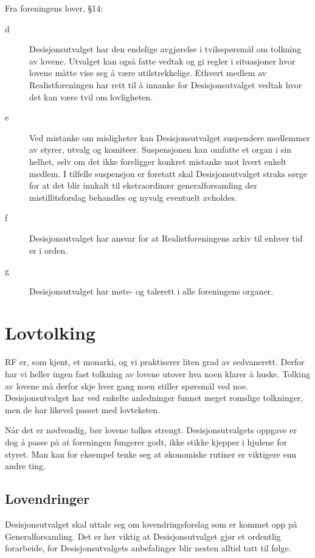 Fra foreningens lover, §14:
\begin{description}
\item[d] Desisjonsutvalget har den endelige avgjørelse i tvilsspørsmål om
tolkning av lovene. Utvalget kan også fatte vedtak og gi regler i situasjoner
hvor lovene måtte vise seg å være utilstrekkelige. Ethvert medlem av
Realistforeningen har rett til å innanke for Desisjonsutvalget vedtak hvor det
kan være tvil om lovligheten.
\item[e] Ved mistanke om misligheter kan Desisjonsutvalget suspendere
medlemmer av styrer, utvalg og komiteer. Suspensjonen kan omfatte et organ i
sin helhet, selv om det ikke foreligger konkret mistanke mot hvert enkelt
medlem. I tilfelle suspensjon er foretatt skal Desisjonsutvalget straks sørge
for at det blir innkalt til ekstraordinær generalforsamling der
mistillitsforslag behandles og nyvalg eventuelt avholdes.
\item[f] Desisjonsutvalget har ansvar for at Realistforeningens arkiv til 
enhver tid er i orden.
\item[g] Desisjonsutvalget har møte- og talerett i alle foreningens organer.
\end{description}

\section{Lovtolking}
RF er, som kjent, et monarki, og vi praktiserer liten grad av sedvanerett. Derfor har vi
heller ingen fast tolkning av lovene utover hva noen klarer å huske. Tolking av lovene
må derfor skje hver gang noen stiller spørsmål ved noe. Desisjonsutvalget har ved enkelte
anledninger funnet meget romslige tolkninger, men de har likevel passet med lovteksten.

Når det er nødvendig, bør lovene tolkes strengt. Desisjonsutvalgets oppgave er dog å passe på
at foreningen fungerer godt, ikke stikke kjepper i hjulene for styret. Man kan for eksempel
tenke seg at økonomiske rutiner er viktigere enn andre ting.

\subsection{Lovendringer}
Desisjonsutvalget skal uttale seg om lovendringsforslag som er kommet opp på Generalforsamling.
Det er her viktig at Desisjonsutvalget gjør et ordentlig forarbeide, for Desisjonsutvalgets
anbefalinger blir nesten alltid tatt til følge.

